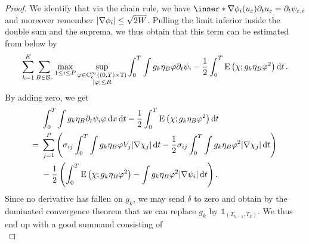 \begin{proof}
\begin{comment}
	\varphi
	\dd{ x }
	\dd{ t } 
	\\
	& \qquad \qquad \qquad \qquad \qquad \qquad \quad 
	\:\, -
	\frac{ 1 }{ 2 }
	\int_{ 0 }^{ T }
	\int
	g_{ k } \eta_{ B }
	\frac{ 1 }{ \varepsilon }
	2 W ( u_{ \varepsilon } )
	\varphi^{ 2 }
	\dd{ x }
	\dd{ t }
\end{comment}
	We identify that via the chain rule, we have $ \inner*{ \nabla \phi_{ i } ( 
	u_{ \varepsilon } ) }{ \partial_{ t } u_{ \varepsilon } } = \partial_{ t } 
	\psi_{ \varepsilon , i } $ and moreover remember $ \abs{ \nabla \phi_{ i } 
	} \leq \sqrt{ 2 W } $.
	Pulling the limit inferior inside the double sum and the suprema, we thus 
	obtain 
	that this term can be estimated from below by
	\begin{equation*}\sum_{ k = 1 }^{ K }
		\sum_{ B \in \mathcal{ B }_{ r } }
		\max_{ 1 \leq i \leq P }
		\sup_{ 
			\substack{ 
				\varphi \in \operatorname{C}_{ \mathrm{c} }^{ \infty } 
				\left( ( 0 , T ) \times \operatorname{\mathbb{T}} \right)
				\\
				\abs{ \varphi } \leq R  
			}
		}
		\int_{ 0 }^{ T }
		\int
		g_{ k } \eta_{ B }
		\varphi
		\partial_{ t } \psi_{ i }
		-
		\frac{ 1 }{ 2 }
		\int_{ 0 }^{ T }
		\operatorname{E} \left( \chi ; g_{ k } \eta_{ B } \varphi^{ 2 } \right)
		\dd{ t }.
		\end{equation*}
		By adding zero, we get
		\begin{align*}
		& \int_{ 0 }^{ T }
		\int
		g_{ k } \eta_{ B }
		\partial_{ t } \psi_{ i }
		\varphi
		\dd{ x }
		\dd{ t } 
		-
		\frac{ 1 }{ 2 }
		\int_{ 0 }^{ T }
		\operatorname{E} \left( \chi ; g_{ k } \eta_{ B } \varphi^{ 2 } \right)
		\dd{ t }
		\\
		={}&
		\sum_{ j = 1 }^{ P }
		\left(
		\sigma_{ i j }
		\int_{ 0 }^{ T }
		\int
		g_{ k } \eta_{ B }
		\varphi
		V_{ j }
		\abs{ \nabla \chi_{ j } }
		\dd{ t } 
		-
		\frac{ 1 }{ 2 }
		\sigma_{ i j }
		\int_{ 0 }^{ T }
			\int
				g_{ k } \eta_{ B }
				\varphi^{ 2 }
			\abs{ \nabla \chi_{ j } }
		\dd{ t }
		\right)\\
		& 
		-\frac{ 1 }{ 2 }
		\left(
		\int_{ 0 }^{ T }
		\operatorname{E} \left( \chi ; g_{ k } \eta_{ B } \varphi^{ 2 } \right)
		-
		\int
			g_{ k } \eta_{ B }
			\varphi^{ 2 }
			\abs{ \nabla \psi_{ i } }
		\dd{ t }
		\right).
	\end{align*}
	Since no derivative has fallen on $ g_{ k } $, we may send $ \delta $ to 
	zero and 
	obtain by the dominated convergence theorem that we can replace $ g_{ k } $ 
	by $ \mathds{ 1 }_{ ( T_{ k - 1 } , T_{ k } ) } $. We thus end up with a 
	good summand consisting of
	\begin{equation}

\end{equation}
\end{proof}
